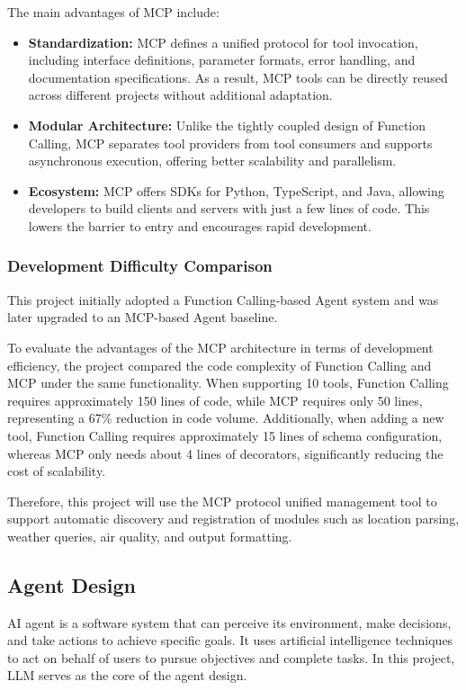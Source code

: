 \documentclass[final-report]{report-template}
\begin{document}
The main advantages of MCP include:

\begin{itemize}
    \item \textbf{Standardization:} MCP defines a unified protocol for tool invocation, including interface definitions, parameter formats, error handling, and documentation specifications. As a result, MCP tools can be directly reused across different projects without additional adaptation.

    \item \textbf{Modular Architecture:} Unlike the tightly coupled design of Function Calling, MCP separates tool providers from tool consumers and supports asynchronous execution, offering better scalability and parallelism.

    \item \textbf{Ecosystem:} MCP offers SDKs for Python, TypeScript, and Java, allowing developers to build clients and servers with just a few lines of code. This lowers the barrier to entry and encourages rapid development.
\end{itemize}

\subsubsection{Development Difficulty Comparison}

This project initially adopted a Function Calling-based Agent system and was later upgraded to an MCP-based Agent baseline. 

To evaluate the advantages of the MCP architecture in terms of development efficiency, the project compared the code complexity of Function Calling and MCP under the same functionality. When supporting 10 tools, Function Calling requires approximately 150 lines of code, while MCP requires only 50 lines, representing a 67\% reduction in code volume. Additionally, when adding a new tool, Function Calling requires approximately 15 lines of schema configuration, whereas MCP only needs about 4 lines of decorators, significantly reducing the cost of scalability.

Therefore, this project will use the MCP protocol unified management tool to support automatic discovery and registration of modules such as location parsing, weather queries, air quality, and output formatting.

\subsection{Agent Design}
AI agent is a software system that can perceive its environment, make decisions, and take actions to achieve specific goals. It uses artificial intelligence techniques to act on behalf of users to pursue objectives and complete tasks. In this project, LLM serves as the core of the agent design.
\end{document}
